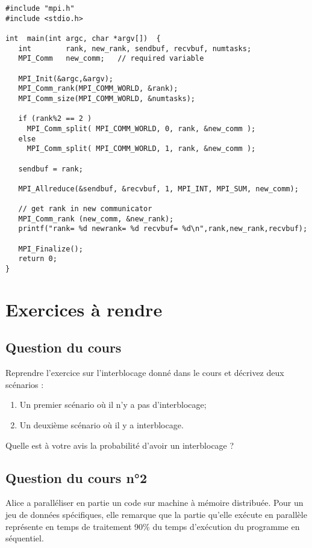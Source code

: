 \documentclass[11pt,a4paper]{article}
\begin{document}
\begin{lstlisting}
#include "mpi.h"
#include <stdio.h>

int  main(int argc, char *argv[])  {
   int        rank, new_rank, sendbuf, recvbuf, numtasks;
   MPI_Comm   new_comm;   // required variable

   MPI_Init(&argc,&argv);
   MPI_Comm_rank(MPI_COMM_WORLD, &rank);
   MPI_Comm_size(MPI_COMM_WORLD, &numtasks);

   if (rank%2 == 2 )
     MPI_Comm_split( MPI_COMM_WORLD, 0, rank, &new_comm );
   else
     MPI_Comm_split( MPI_COMM_WORLD, 1, rank, &new_comm );

   sendbuf = rank;

   MPI_Allreduce(&sendbuf, &recvbuf, 1, MPI_INT, MPI_SUM, new_comm);

   // get rank in new communicator
   MPI_Comm_rank (new_comm, &new_rank);
   printf("rank= %d newrank= %d recvbuf= %d\n",rank,new_rank,recvbuf);

   MPI_Finalize();
   return 0;
}
\end{lstlisting}

\section{Exercices à rendre}

\subsection{Question du cours}

Reprendre l'exercice sur l'interblocage donné dans le cours et décrivez deux scénarios :
\begin{enumerate}
    \item Un premier scénario où il n'y a pas d'interblocage;
    \item Un deuxième scénario où il y a interblocage.
\end{enumerate}

Quelle est à votre avis la probabilité d'avoir un interblocage ?

\subsection{Question du cours n°2}

Alice a paralléliser en partie un code sur machine à mémoire distribuée. Pour un jeu de données spécifiques,
elle remarque que la partie qu'elle exécute en parallèle représente en temps de traitement 90\% du
temps d'exécution du programme en séquentiel.
\end{document}
